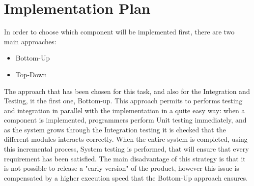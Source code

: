 \section{Implementation Plan}

In order to choose which component will be implemented first, there are two main approaches:
\begin{itemize}
    \item Bottom-Up
    \item Top-Down 
\end{itemize}
The approach that has been chosen for this task, and also for the Integration and Testing, it the first one, Bottom-up.
This approach permits to performs testing and integration in parallel with the implementation in a quite easy way: when a component is implemented, programmers perform Unit testing immediately, and as the system grows through the Integration testing it is checked that the different modules interacts correctly. When the entire system is completed, using this incremental process, System testing is performed, that will ensure that every requirement has been satisfied.
The main disadvantage of this strategy is that it is not possible to release a "early version" of the product, however this issue is compensated by a higher execution speed that the Bottom-Up approach ensures.